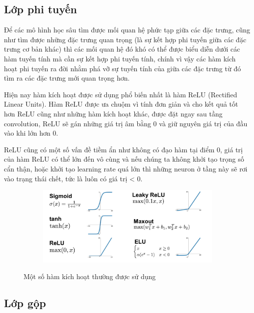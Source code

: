 \subsection{Lớp phi tuyến}

Để các mô hình học sâu tìm được mối quan hệ phức tạp giữa các đặc trưng, cũng như tìm được những đặc trưng quan trọng
(là sự kết hợp phi tuyến giữa các đặc trưng cơ bản khác) thì các mối quan hệ đó khó có thể được biểu diễn dưới các hàm tuyến tính
mà cần sự kết hợp phi tuyến tính, chính vì vậy các hàm kích hoạt phi tuyến ra đời nhằm phá vỡ sự tuyến tính của giữa các đặc trưng từ đó tìm
ra các đặc trưng mới quan trọng hơn.

Hiện nay hàm kích hoạt được sử dụng phổ biến nhất là hàm ReLU (Rectified Linear Units). Hàm ReLU được ưa chuộm vì tính đơn giản và cho kết quả tốt hơn
ReLU cũng như những hàm kích hoạt khác, được đặt ngay sau tầng convolution, ReLU sẽ gán những giá trị âm bằng 0 và giữ nguyên giá trị của đầu vào khi lớn hơn 0.

ReLU cũng có một số vấn đề tiềm ẩn như không có đạo hàm tại điểm 0, giá trị của hàm ReLU có thể lớn đến vô cùng và
nếu chúng ta không khởi tạo trọng số cẩn thận, hoặc khởi tạo learning rate quá lớn thì những neuron ở tầng này sẽ rơi vào trạng thái chết, tức là luôn có giá trị < 0.

\begin{figure}
    \begin{subfigure}{1.\textwidth}
        \begin{center}
            \includegraphics[width=1.\linewidth]{Chapters/items/chap2_6.jpg}
        \end{center}
        \label{fig:chap2_6}
    \end{subfigure}
    \caption{Một số hàm kích hoạt thường được sử dụng}
\end{figure}

\newpage
\subsection{Lớp gộp}

